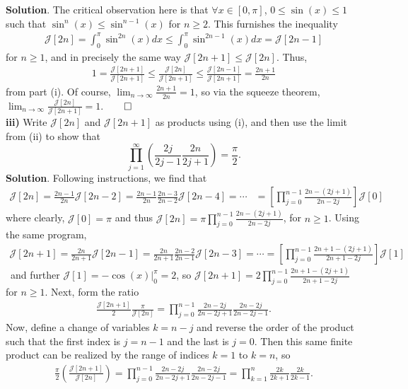 \documentclass[10pt]{article}
\newcommand{\1}[1]{\mathbbm{1}_{#1}}
\newcommand{\mc}[1]{\mathcal{#1}}
\begin{document}
    {\bf Solution}. The critical observation here is that $\forall x\in[0,\pi]$, $0\leq \sin(x)\leq 1$ such that $\sin^{n}(x)\leq \sin^{n-1}(x)$ for $n\geq 2$. This furnishes the inequality
    \begin{align*}
        \mc{J}[2n]=\int_0^\pi\sin^{2n}(x)dx\leq\int_0^\pi\sin^{2n-1}(x)dx=\mc{J}[2n-1]
    \end{align*}
    for $n\geq 1$, and in precisely the same way $\mc{J}[2n+1]\leq \mc{J}[2n]$. Thus,
    \begin{align*}
        1=\frac{\mc{J}[2n+1]}{\mc{J}[2n+1]}\leq \frac{\mc{J}[2n]}{\mc{J}[2n+1]}\leq \frac{\mc{J}[2n-1]}{\mc{J}[2n+1]}=\frac{2n+1}{2n}
    \end{align*}
    from part (i). Of course, $\lim_{n\rightarrow\infty}\tfrac{2n+1}{2n}=1$, so via the squeeze theorem, $\lim_{n\rightarrow\infty}\tfrac{\mc{J}[2n]}{\mc{J}[2n+1]}=1$.\hfill{$\qed$}\\[5pt]
    {\bf iii)} Write $\mc{J}[2n]$ and $\mc{J}[2n+1]$ as products using (i), and then use the limit from (ii) to show that 
    \[\prod_{j=1}^\infty\left(\frac{2j}{2j-1}\frac{2n}{2j+1}\right)=\frac{\pi}{2}.\]
    {\bf Solution}. Following instructions, we find that
    \begin{align*}
        \mc{J}[2n]=\frac{2n-1}{2n}\mc{J}[2n-2]=\frac{2n-1}{2n}\frac{2n-3}{2n-2}\mc{J}[2n-4]=\cdots&=\left[\prod_{j=0}^{n-1}\frac{2n-(2j+1)}{2n-2j}\right]\mc{J}[0]
    \end{align*}
    where clearly, $\mc{J}[0]=\pi$ and thus $\mc{J}[2n]=\pi \prod_{j=0}^{n-1}\tfrac{2n-(2j+1)}{2n-2j}$, for $n\geq 1$. Using the same program,
    \begin{align*}
        \mc{J}[2n+1]=\frac{2n}{2n+1}\mc{J}[2n-1]=\frac{2n}{2n+1}\frac{2n-2}{2n-1}\mc{J}[2n-3]=\cdots=\left[\prod_{j=0}^{n-1}\frac{2n+1-(2j+1)}{2n+1-2j}\right]\mc{J}[1]
    \end{align*}\
    and further $\mc{J}[1]=-\cos(x)\big|^\pi_0=2$, so $\mc{J}[2n+1]=2\prod_{j=0}^{n-1}\tfrac{2n+1-(2j+1)}{2n+1-2j}$ for $n\geq 1$. Next, form the ratio
    \begin{align*}
        \frac{\mc{J}[2n+1]}{2}\frac{\pi}{\mc{J}[2n]}=\prod_{j=0}^{n-1}\frac{2n-2j}{2n-2j+1}\frac{2n-2j}{2n-2j-1}.
    \end{align*}
    Now, define a change of variables $k=n-j$ and reverse the order of the product such that the first index is $j=n-1$ and the last is $j=0$. Then this same finite product can be realized by
    the range of indices $k=1$ to $k=n$, so
    \begin{align*}
        \frac{\pi}{2}\left(\frac{\mc{J}[2n+1]}{\mc{J}[2n]}\right)=\prod_{j=0}^{n-1}\frac{2n-2j}{2n-2j+1}\frac{2n-2j}{2n-2j-1}=\prod_{k=1}^n\frac{2k}{2k+1}\frac{2k}{2k-1}.
    \end{align*}
\end{document}
